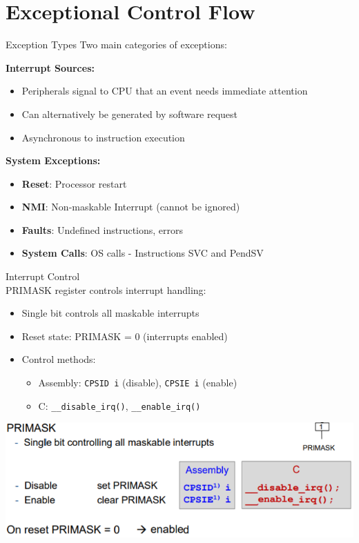 \section{Exceptional Control Flow}

\begin{concept}{Exception Types}
Two main categories of exceptions:

\textbf{Interrupt Sources:}
\begin{itemize}
  \item Peripherals signal to CPU that an event needs immediate attention
  \item Can alternatively be generated by software request
  \item Asynchronous to instruction execution
\end{itemize}

\textbf{System Exceptions:}
\begin{itemize}
  \item \textbf{Reset}: Processor restart
  \item \textbf{NMI}: Non-maskable Interrupt (cannot be ignored)
  \item \textbf{Faults}: Undefined instructions, errors
  \item \textbf{System Calls}: OS calls - Instructions SVC and PendSV
\end{itemize}
\end{concept}

\begin{definition}{Interrupt Control}\\
PRIMASK register controls interrupt handling:
\begin{itemize}
  \item Single bit controls all maskable interrupts
  \item Reset state: PRIMASK = 0 (interrupts enabled)
  \item Control methods:
    \begin{itemize}
      \item Assembly: \texttt{CPSID i} (disable), \texttt{CPSIE i} (enable)
      \item C: \texttt{\_\_disable\_irq()}, \texttt{\_\_enable\_irq()}
    \end{itemize}
\end{itemize}

\includegraphics[width=\linewidth]{images/primask.png}
\end{definition}


